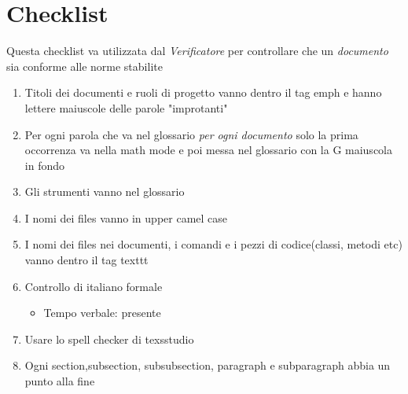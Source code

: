 \section{Checklist}
Questa checklist va utilizzata dal \emph{Verificatore} per controllare che un \emph{documento} sia conforme alle norme stabilite

\begin{enumerate}
	\item Titoli dei documenti e ruoli di progetto vanno dentro il tag emph e hanno lettere maiuscole delle parole "improtanti"
	\item Per ogni parola che va nel glossario \emph{per ogni documento} solo la prima occorrenza va nella math mode e poi messa nel glossario con la G maiuscola in fondo
	\item Gli strumenti vanno nel glossario
	\item I nomi dei files vanno in upper camel case
	\item I nomi dei files nei documenti, i comandi e i pezzi di codice(classi, metodi etc) vanno dentro il tag texttt
	\item Controllo di italiano formale
	\begin{itemize}
		\item Tempo verbale: presente
	\end{itemize}
	\item Usare lo spell checker di texsstudio
	\item Ogni section,subsection, subsubsection, paragraph e subparagraph abbia un punto alla fine
\end{enumerate}